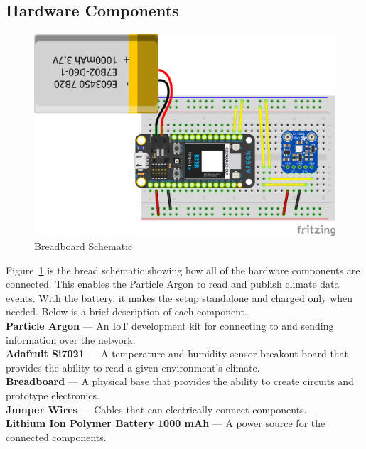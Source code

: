 \documentclass{article}
\begin{document}
\subsection{Hardware Components}
\label{section:hardware}
\begin{figure}[H]
	\center
	\includegraphics[width=\textwidth]{images/breadboard-schematic.png}
	\caption{Breadboard Schematic}
	\label{fig:breadboard_schematic}
\end{figure}

Figure~\ref{fig:breadboard_schematic} is the bread schematic showing how all of the hardware components are connected. This enables the Particle Argon to read and publish climate data events. With the battery, it makes the setup standalone and charged only when needed. Below is a brief description of each component.\\

\textbf{Particle Argon} — An IoT development kit for connecting to and sending information over the network.\\

\textbf{Adafruit Si7021} — A temperature and humidity sensor breakout board that provides the ability to read a given environment's climate.\\

\textbf{Breadboard} — A physical base that provides the ability to create circuits and prototype electronics.\\

\textbf{Jumper Wires} — Cables that can electrically connect components.\\

\textbf{Lithium Ion Polymer Battery 1000 mAh} — A power source for the connected components.
\end{document}
